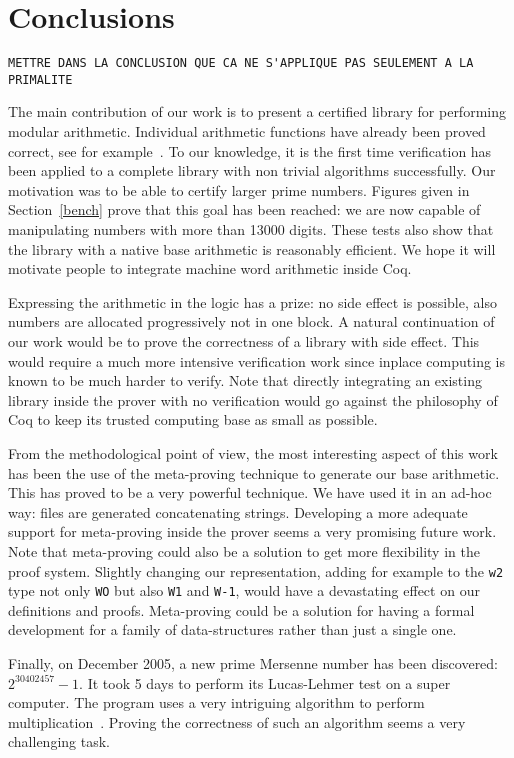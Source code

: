 \section{Conclusions}

\begin{verbatim}
METTRE DANS LA CONCLUSION QUE CA NE S'APPLIQUE PAS SEULEMENT A LA PRIMALITE
\end{verbatim}

The main contribution of our work is to present a certified library for performing
modular arithmetic. Individual arithmetic functions have already been proved correct,
see for example~\cite{BerMagZim02}. To our knowledge, it is the first time verification
has been applied to a complete library  with non trivial algorithms successfully.
Our motivation was to be able to certify  larger prime numbers. Figures given in Section~\ref{bench} 
prove that this goal has been reached: we are now capable of manipulating numbers with more than 13000 digits.
These tests also show that the library with a native base arithmetic is
reasonably efficient. We hope it will motivate people to integrate machine word arithmetic inside {\sc Coq}.

Expressing the arithmetic in the logic has a prize: no side effect is possible, 
also numbers are allocated progressively not in one block.
A natural continuation of our work would be to prove the correctness of a library with side effect.
This would require a much more intensive verification work since inplace computing
is known to be much harder to verify.
Note that directly integrating an existing library inside the prover with no verification
would go against the philosophy of {\sc Coq} to keep its trusted computing base as small
as possible.

From the methodological point of view, the most interesting aspect of this work
has been the use of the meta-proving technique to generate our base arithmetic. This has proved
to be a very powerful technique. We have used it in an ad-hoc way: files are generated concatenating
strings. Developing a more adequate support for meta-proving inside the prover seems a
very promising future work. Note that meta-proving could also be a solution to get more flexibility
in the proof system. Slightly changing our representation, adding for example to  the {\tt w2} type not only {\tt WO}
but also {\tt W1} and {\tt W-1}, would have a devastating effect on our definitions and proofs.
Meta-proving could be a solution for having a formal development for a family of data-structures rather than
just a single one.

Finally, on December 2005, a new prime Mersenne number has been discovered: $2 ^{30402457} - 1$.
It took 5 days to  perform its Lucas-Lehmer test on a super computer. 
The program uses a very intriguing algorithm to perform 
multiplication~\cite{crandall}. 
Proving the correctness of
such an algorithm seems a very challenging task. 
